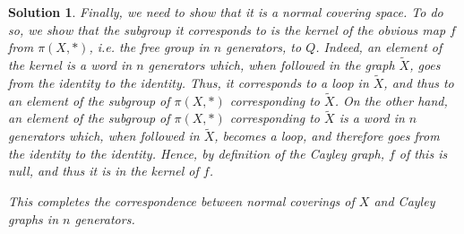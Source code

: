 \documentclass{article}
\theoremstyle{plain}
\theoremstyle{nonumberplain}
\newtheorem{sol}{Solution}
\begin{document}
\begin{sol}
Finally, we need to show that it is a normal covering space. To do so, we show that the subgroup it corresponds to is the kernel of the obvious map $f$ from $\pi(X,*)$, i.e. the free group in $n$ generators, to $Q$. Indeed, an element of the kernel is a word in $n$ generators which, when followed in the graph $\tilde X$, goes from the identity to the identity. Thus, it corresponds to a loop in $\tilde X$, and thus to an element of the subgroup of $\pi(X,*)$ corresponding to $\tilde X$. On the other hand, an element of the subgroup of $\pi(X,*)$ corresponding to $\tilde X$ is a word in $n$ generators which, when followed in $\tilde X$, becomes a loop, and therefore goes from the identity to the identity. Hence, by definition of the Cayley graph, $f$ of this is null, and thus it is in the kernel of $f$.

This completes the correspondence between normal coverings of $X$ and Cayley graphs in $n$ generators.
\end{sol}
\end{document}
